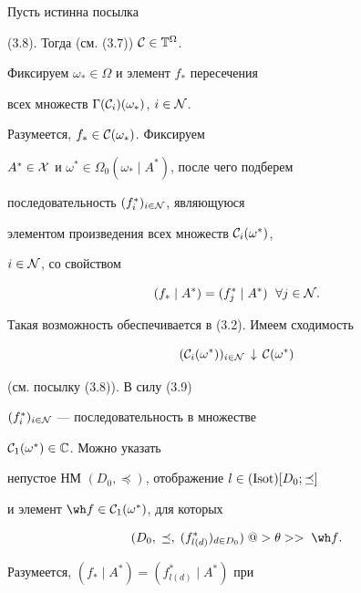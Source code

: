 \begin{pf}


Пусть истинна посылка


(3.8). Тогда (см. (3.7)) ${\cal C} \in {{\Bbb T}^{\Omega}}$.


Фиксируем ${{\omega}_*} \in {\Omega}$ и элемент $f_*$ пересечения


всех множеств ${{\Gamma}({\cal C}_i)({\omega}_*)}$, $i \in {\cal N}$.


Разумеется, ${f_*} \in {{\cal C}({\omega}_*)}$. Фиксируем


${A^*} \in {\cal X}$ и ${{\omega}^*} \in {{\Omega}_0}({{\omega}_*} \mid


{A^*})$, после чего подберем


последовательность $({f^*_i})_{i \in {\cal N}}$, являющуюся


элементом произведения всех множеств ${{{\cal C}_i}({\omega}^*)}$,


$i \in {\cal N}$, со свойством


$$


({f_*} \mid {A^*}) = ({f^*_j} \mid {A^*}) \ \; \forall{j} \in {\cal N}.


$$


Такая возможность обеспечивается в (3.2). Имеем сходимость


\begin{equation}


({{\cal C}_i}({\omega}^*))_{i \in {\cal N}}\,\downarrow\,{\cal C}({\omega}^*)


\end{equation}


(см. посылку (3.8)). В силу (3.9)\;


$({f^*_i})_{i \in {\cal N}}$ --- последовательность в множестве


${{\cal C}_1}({\omega}^*) \in {\Bbb C}$. Можно указать


непустое НМ $({D_0},\preceq)$, отображение $l \in (\operatorname{Isot})[{D_0};\preceq]$


и элемент ${\wh f} \in {{{\cal C}_1}({\omega}^*)}$, для которых


\begin{equation}


({D_0},\;\preceq,\;


({f^*_{l(d)}})_{d \in {D_0}})\;@>{\theta}>>\;{\wh f}.


\end{equation}


Разумеется, $({f_*} \mid {A^*}) = ({f^*_{l(d)}} \mid {A^*})$ при



\end{pf}
